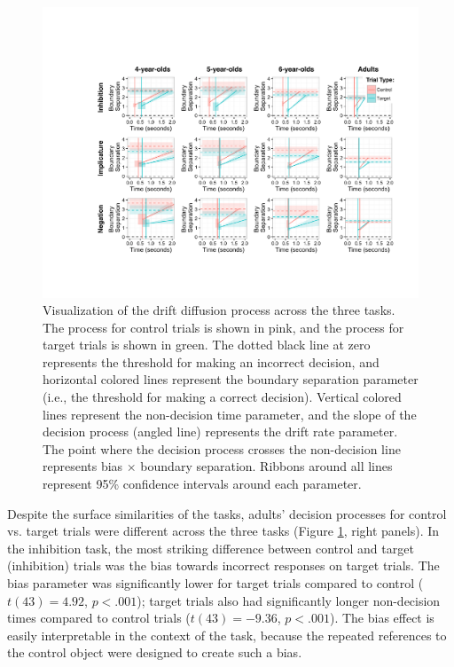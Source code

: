 \documentclass[10pt,letterpaper]{article}
\begin{document}
\begin{figure}[t!]
\begin{center}
\includegraphics[width=\textwidth]{figures/ddm_vis.pdf}
\caption{\label{fig:ddm} Visualization of the drift diffusion process across the three tasks. The process for control trials is shown in pink, and the process for target trials is shown in green. The dotted black line at zero represents the threshold for making an incorrect decision, and horizontal colored lines represent the boundary separation parameter (i.e., the threshold for making a correct decision). Vertical colored lines represent the non-decision time parameter, and the slope of the decision process (angled line) represents the drift rate parameter. The point where the decision process crosses the non-decision line represents bias $\times$ boundary separation. Ribbons around all lines represent 95\% confidence intervals around each parameter.}
\end{center}
\end{figure}

Despite the surface similarities of the tasks, adults' decision processes for control vs. target trials were different across the three tasks (Figure \ref{fig:ddm}, right panels). In the inhibition task, the most striking difference between control and target (inhibition) trials was the bias towards incorrect responses on target trials. The bias parameter was significantly lower for target trials compared to control ($t(43) = 4.92$, $p< .001$); target trials also had significantly longer non-decision times compared to control trials ($t(43) = -9.36$, $p< .001$). The bias effect is easily interpretable in the context of the task, because the repeated references to the control object were designed to create such a bias.
\end{document}
